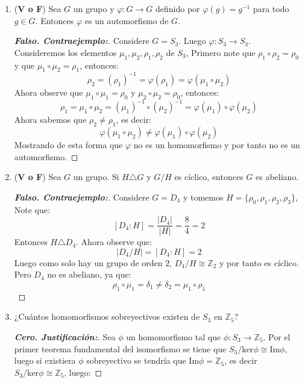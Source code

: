 \documentclass[12pt]{article}
\begin{document}
\begin{enumerate}
\begin{proof}[\textbf{Verdadero. Demostración:}]
\begin{align*}
                    &=xx^{-1}=e
    \end{align*}
    Note que como $x$ es arbitrario, se tiene que para todo $x\in G$ el elemento $xax^{-1}$ es de orden $2$ pero por hipótesis $a$ es el único elemento de orden $2$, entonces se debe tener que $xax^{-1}=a$, es decir que para todo $x\in G$, $xa=ax$. De esta forma podemos concluir que $a$ es un elemento del centro de $G$.
    \end{proof}
    \item (\textbf{V o F}) Sea $G$ un grupo y $\varphi:G\to G$ definido por $\varphi(g)=g^{-1}$ para todo $g\in G$. Entonces $\varphi$ es un automorfismo de $G$.
    \begin{proof}[\textbf{Falso. Contraejemplo:}] Considere $G=S_3$. Luego $\varphi:S_3\to S_3$. Consideremos los elementos $\mu_1,\mu_2,\rho_1,\rho_2$ de $S_3$, Primero note que $\rho_1\circ\rho_2=\rho_0$ y que $\mu_1\circ\mu_2=\rho_1$, entonces: 
    $$\rho_2=(\rho_1)^{-1}=\varphi(\rho_1)=\varphi(\mu_1\circ\mu_2)$$
    Ahora observe que $\mu_1\circ\mu_1=\rho_0$ y $\mu_2\circ\mu_2=\rho_0$, entonces:
    $$\rho_1=\mu_1\circ\mu_2=(\mu_1)^{-1}\circ(\mu_2)^{-1}=\varphi(\mu_1)\circ\varphi(\mu_2)$$
    Ahora sabemos que $\rho_2\neq\rho_1$, es decir:
    $$\varphi(\mu_1\circ\mu_2)\neq\varphi(\mu_1)\circ\varphi(\mu_2)$$
    Mostrando de esta forma que $\varphi$ no es un homomorfismo y por tanto no es un automorfismo.
    \end{proof}
    \item (\textbf{V o F}) Sea $G$ un grupo. Si $H\triangle G$ y $G/H$ es cíclico, entonces $G$ es abeliano.
    \begin{proof}[\textbf{Falso. Contraejemplo:}] Considere $G=D_4$ y tomemos $H=\{\rho_0,\rho_1,\rho_2,\rho_3\}$, Note que: 
        $$[D_4:H]=\frac{|D_4|}{|H|}=\frac{8}{4}=2$$
    Entonces $H\triangle D_4$. Ahora observe que:
        $$\left|D_4/H\right|=[D_4:H]=2$$
    Luego como solo hay un grupo de orden $2$, $D_4/H\cong\mathbb{Z}_2$ y por tanto es cíclico. Pero $D_4$ no es abeliano, ya que:
        $$\rho_1\circ\mu_1=\delta_1\neq\delta_2=\mu_1\circ\rho_1$$
    \end{proof}
    \item ¿Cuántos homomorfismos sobreyectivos existen de $S_3$ en $\mathbb{Z}_5$?
    \begin{proof}[\textbf{Cero. Justificación:}] Sea $\phi$ un homomorfismo tal que $\phi:S_3\to\mathbb{Z}_5$. Por el primer teorema fundamental del isomorfismo se tiene que $S_3/\text{ker}\phi\cong \text{Im}\phi$, luego si existiera $\phi$  sobreyectivo se tendría que $\text{Im}\phi=\mathbb{Z}_5$, es decir $S_3/\text{ker}\phi\cong\mathbb{Z}_5$, luego: 

\end{proof}
\end{enumerate}
\end{document}
